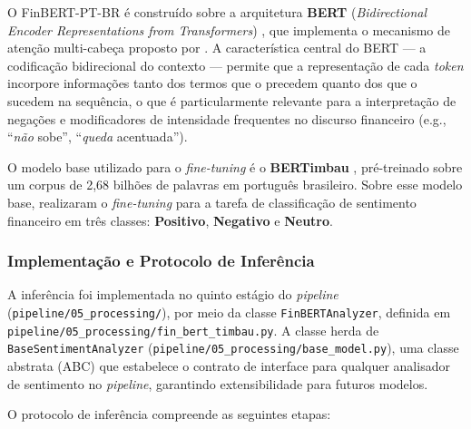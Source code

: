 O FinBERT-PT-BR é construído sobre a arquitetura \textbf{BERT} (\textit{Bidirectional Encoder Representations from Transformers}) \cite{devlin2019}, que implementa o mecanismo de atenção multi-cabeça proposto por . A característica central do BERT — a codificação bidirecional do contexto — permite que a
representação de cada \textit{token} incorpore informações tanto dos termos que o precedem quanto dos que o sucedem na sequência, o que é particularmente relevante para a interpretação de negações e modificadores de intensidade frequentes no discurso financeiro (e.g., ``\textit{não} sobe'', ``\textit{queda} acentuada'').

O modelo base utilizado para o \textit{fine-tuning} é o \textbf{BERTimbau} \cite{souza2020}, pré-treinado sobre um corpus de 2,68 bilhões de palavras em português brasileiro. Sobre esse modelo base,  realizaram o \textit{fine-tuning} para a tarefa de classificação de sentimento financeiro em três classes:
\textbf{Positivo}, \textbf{Negativo} e \textbf{Neutro}.

\subsubsection{Implementação e Protocolo de Inferência}
\label{subsubsec:protocolo_inferencia}

A inferência foi implementada no quinto estágio do \textit{pipeline} (\texttt{pipeline/05\_processing/}), por meio da classe \texttt{FinBERTAnalyzer}, definida em
\texttt{pipeline/05\_processing/fin\_bert\_timbau.py}. A classe herda de \texttt{BaseSentimentAnalyzer} (\texttt{pipeline/05\_processing/base\_model.py}), uma classe abstrata (ABC) que estabelece o contrato de interface para qualquer analisador de sentimento no \textit{pipeline}, garantindo extensibilidade para futuros modelos.

O protocolo de inferência compreende as seguintes etapas:

